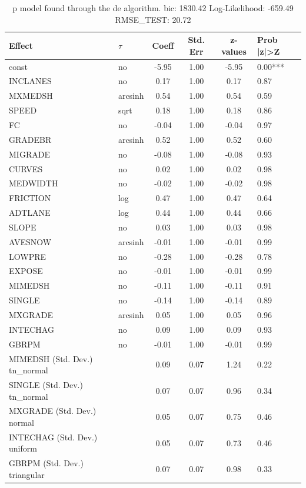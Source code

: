 \begin{table}
	\caption{p model found through the de algorithm. bic: 1830.42 Log-Likelihood: -659.49 RMSE_TEST: 20.72}
	\begin{center}
		\begin{tabular}{|l|l|c|c|c|l|}
			\hline
			Effect & $\tau$ & Coeff & Std. Err & z-values & Prob |z|>Z \\
			\hline
			const & no & -5.95 & 1.00 & -5.95 & 0.00*** \\
			\hline
			INCLANES & no & 0.17 & 1.00 & 0.17 & 0.87 \\
			\hline
			MXMEDSH & arcsinh & 0.54 & 1.00 & 0.54 & 0.59 \\
			\hline
			SPEED & sqrt & 0.18 & 1.00 & 0.18 & 0.86 \\
			\hline
			FC & no & -0.04 & 1.00 & -0.04 & 0.97 \\
			\hline
			GRADEBR & arcsinh & 0.52 & 1.00 & 0.52 & 0.60 \\
			\hline
			MIGRADE & no & -0.08 & 1.00 & -0.08 & 0.93 \\
			\hline
			CURVES & no & 0.02 & 1.00 & 0.02 & 0.98 \\
			\hline
			MEDWIDTH & no & -0.02 & 1.00 & -0.02 & 0.98 \\
			\hline
			FRICTION & log & 0.47 & 1.00 & 0.47 & 0.64 \\
			\hline
			ADTLANE & log & 0.44 & 1.00 & 0.44 & 0.66 \\
			\hline
			SLOPE & no & 0.03 & 1.00 & 0.03 & 0.98 \\
			\hline
			AVESNOW & arcsinh & -0.01 & 1.00 & -0.01 & 0.99 \\
			\hline
			LOWPRE & no & -0.28 & 1.00 & -0.28 & 0.78 \\
			\hline
			EXPOSE & no & -0.01 & 1.00 & -0.01 & 0.99 \\
			\hline
			MIMEDSH & no & -0.11 & 1.00 & -0.11 & 0.91 \\
			\hline
			SINGLE & no & -0.14 & 1.00 & -0.14 & 0.89 \\
			\hline
			MXGRADE & arcsinh & 0.05 & 1.00 & 0.05 & 0.96 \\
			\hline
			INTECHAG & no & 0.09 & 1.00 & 0.09 & 0.93 \\
			\hline
			GBRPM & no & -0.01 & 1.00 & -0.01 & 0.99 \\
			\hline
			MIMEDSH (Std. Dev.) tn_normal &  & 0.09 & 0.07 & 1.24 & 0.22 \\
			\hline
			SINGLE (Std. Dev.) tn_normal &  & 0.07 & 0.07 & 0.96 & 0.34 \\
			\hline
			MXGRADE (Std. Dev.) normal &  & 0.05 & 0.07 & 0.75 & 0.46 \\
			\hline
			INTECHAG (Std. Dev.) uniform &  & 0.05 & 0.07 & 0.73 & 0.46 \\
			\hline
			GBRPM (Std. Dev.) triangular &  & 0.07 & 0.07 & 0.98 & 0.33 \\
			\hline
		\end{tabular}
	\end{center}
\end{table}